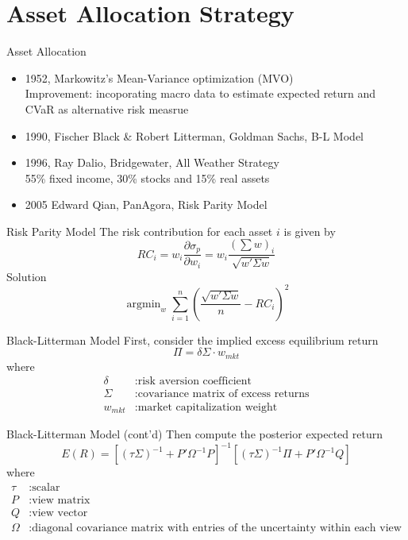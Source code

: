 \documentclass[aspectratio=169,11pt]{beamer}
\DeclareMathOperator*{\argmin}{argmin}
\begin{document}
    \section{Asset Allocation Strategy}
    \begin{frame}{Asset Allocation}
        \begin{itemize}
            \item 1952, Markowitz's Mean-Variance optimization (MVO)\\
            Improvement: incoporating macro data to estimate expected return and CVaR as alternative risk measrue
            \item 1990, Fischer Black \& Robert Litterman, Goldman Sachs, B-L Model
            \item 1996, Ray Dalio, Bridgewater, All Weather Strategy\\
            55\% fixed income, 30\% stocks and 15\% real assets
            \item 2005 Edward Qian, PanAgora, Risk Parity Model
        \end{itemize}
    \end{frame}

    \begin{frame}{Risk Parity Model}
        The risk contribution for each asset \(i\) is given by
        \[RC_i=w_i\frac{\partial \sigma_p}{\partial w_i}=w_i\frac{(\sum w)_i}{\sqrt{w'\Sigma w}}\]    
        Solution
        \[\argmin_w\sum_{i=1}^n\left(\frac{\sqrt{w'\Sigma w}}{n}-RC_i\right)^2\]
    \end{frame}

    \begin{frame}{Black-Litterman Model}
        First, consider the implied excess equilibrium return
        \[\Pi=\delta\Sigma\cdot w_{mkt}\]
        where
        \begin{align*}
            \delta&:\text{risk aversion coefficient}\\
            \Sigma&:\text{covariance matrix of excess returns}\\
            w_{mkt}&:\text{market capitalization weight}
        \end{align*}
    \end{frame}

    \begin{frame}{Black-Litterman Model (cont’d)}
        Then compute the posterior expected return
        \[E(R)=[(\tau\Sigma)^{-1}+P'\Omega^{-1}P]^{-1}[(\tau\Sigma)^{-1}\Pi+P'\Omega^{-1}Q]\]
        where
        \begin{align*}
            \tau&:\text{scalar}\\
            P&:\text{view matrix}\\
            Q&:\text{view vector}\\
            \Omega&:\text{diagonal covariance matrix with entries of the uncertainty within each view}
        \end{align*}
    \end{frame}
\end{document}

